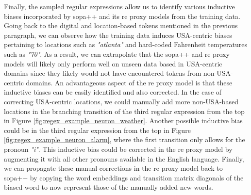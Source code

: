 Finally, the sampled regular expressions allow us to identify various inductive
biases incorporated by \ac{sopa}++ and its \ac{re} proxy models from the training data.
Going back to the digital and location-based tokens mentioned in the previous
paragraph, we can observe how the training data induces USA-centric biases
pertaining to locations such as \textit{"atlanta"} and hard-coded Fahrenheit
temperatures such as \textit{"70"}. As a result, we can extrapolate that the
\ac{sopa}++ and \ac{re} proxy models will likely only perform well on unseen data based in
USA-centric domains since they likely would not have encountered tokens from
non-USA-centric domains. An advantageous aspect of the \ac{re} proxy model is that
these inductive biases can be easily identified and also corrected. In the case
of correcting USA-centric locations, we could manually add more non-USA-based
locations in the branching transition of the third regular expression from the
top in Figure \ref{fig:regex_example_neuron_weather}. Another possible inductive
bias could be in the third regular expression from the top in Figure
\ref{fig:regex_example_neuron_alarm}, where the first transition only allows for
the pronoun \textit{"i"}. This inductive bias could be corrected in the \ac{re} proxy
model by augmenting it with all other pronouns available in the English
language. Finally, we can propagate these manual corrections in the \ac{re} proxy
model back to \ac{sopa}++ by copying the word embeddings and transition matrix
diagonals of the biased word to now represent those of the manually added new
words.


